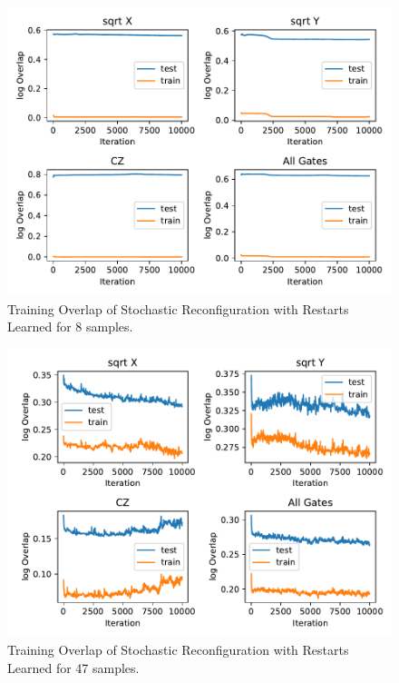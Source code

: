 \begin{figure}[H]
  \centering
  \includegraphics[width=\textwidth]{figures/results/SR-restarts-learned/avgOverlap_8.pdf}
  \caption[Training Overlap of Stochastic Reconfiguration with Restarts Learned]{Training 
  Overlap of Stochastic Reconfiguration with Restarts Learned for 8 samples.}
  \label{fig:sr_tvd}
\end{figure}

\begin{figure}[H]
  \centering
  \includegraphics[width=\textwidth]{figures/results/SR-restarts-learned/avgOverlap_47.pdf}
  \caption[Training Overlap of Stochastic Reconfiguration with Restarts Learned]{Training 
  Overlap of Stochastic Reconfiguration with Restarts Learned for 47 samples.}
  \label{fig:sr_tvd}
\end{figure}

